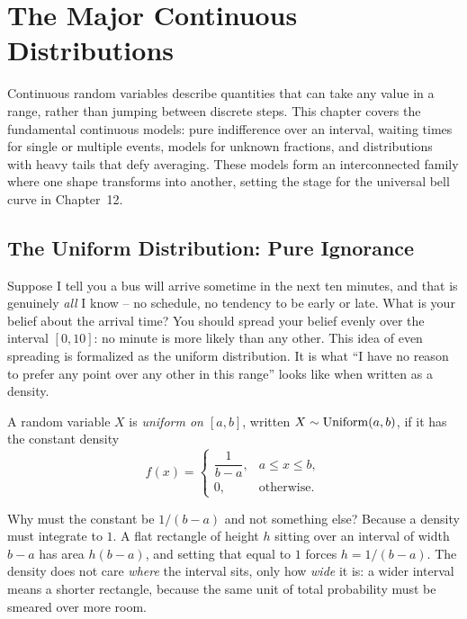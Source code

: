 \chapter{The Major Continuous Distributions}

Continuous random variables describe quantities that can take any value in a range, rather than jumping between discrete steps. This chapter covers the fundamental continuous models: pure indifference over an interval, waiting times for single or multiple events, models for unknown fractions, and distributions with heavy tails that defy averaging. These models form an interconnected family where one shape transforms into another, setting the stage for the universal bell curve in Chapter~12.

\section{The Uniform Distribution: Pure Ignorance}
\label{ch11:uniform}

\begin{intuitionbox}
Suppose I tell you a bus will arrive sometime in the next ten minutes, and that
is genuinely \emph{all} I know -- no schedule, no tendency to be early or late.
What is your belief about the arrival time? You should spread your belief evenly
over the interval $[0,10]$: no minute is more likely than any other. This idea of even
spreading is formalized as the uniform distribution. It is what ``I have no
reason to prefer any point over any other in this range'' looks like when
written as a density.
\end{intuitionbox}

\begin{definition}
\label{ch11:def-uniform}
A random variable $X$ is \emph{uniform on $[a,b]$}, written
$X \sim \operatorname{Uniform}(a,b)$, if it has the constant density
\[
  f(x) = \begin{cases} \dfrac{1}{b-a}, & a \le x \le b, \\[4pt] 0, & \text{otherwise.}\end{cases}
\]
\end{definition}

Why must the constant be $1/(b-a)$ and not something else? Because a density
must integrate to $1$. A flat rectangle of height $h$ sitting over an interval
of width $b-a$ has area $h(b-a)$, and setting that equal to $1$ forces
$h = 1/(b-a)$. The density does not care \emph{where} the interval sits, only
how \emph{wide} it is: a wider interval means a shorter rectangle, because the
same unit of total probability must be smeared over more room.

